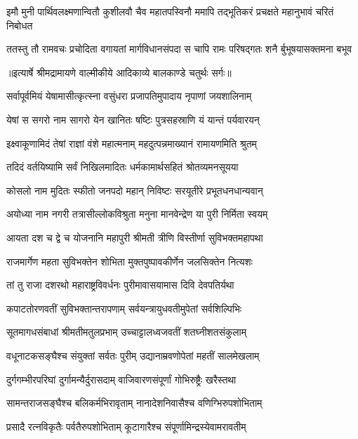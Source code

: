 \fourlineindentedshloka
{इमौ मुनी पार्थिवलक्ष्मणान्वितौ}
{ कुशीलवौ चैव महातपस्विनौ}
{ममापि तद्भूतिकरं प्रचक्षते}
{ महानुभावं चरितं निबोधत} %

\fourlineindentedshloka
{ततस्तु तौ रामवचः प्रचोदिता}
{वगायतां मार्गविधानसंपदा}
{स चापि रामः परिषद्गतः शनै}
{र्बुभूषयासक्तमना बभूव} %


{॥इत्यार्षे श्रीमद्रामायणे वाल्मीकीये आदिकाव्ये बालकाण्डे चतुर्थः सर्गः॥}


\twolineshloka
{सर्वापूर्वमियं येषामासीत्कृत्स्ना वसुंधरा}
{प्रजापतिमुपादाय नृपाणां जयशालिनाम्} %

\twolineshloka
{येषां स सगरो नाम सागरो येन खानितः}
{षष्टिः पुत्रसहस्राणि यं यान्तं पर्यवारयन्} %

\twolineshloka
{इक्ष्वाकूणामिदं तेषां राज्ञां वंशे महात्मनाम्}
{महदुत्पन्नमाख्यानं रामायणमिति श्रुतम्} %

\twolineshloka
{तदिदं वर्तयिष्यामि सर्वं निखिलमादितः}
{धर्मकामार्थसहितं श्रोतव्यमनसूयया} %

\twolineshloka
{कोसलो नाम मुदितः स्फीतो जनपदो महान्}
{निविष्टः सरयूतीरे प्रभूतधनधान्यवान्} %

\twolineshloka
{अयोध्या नाम नगरी तत्रासील्लोकविश्रुता}
{मनुना मानवेन्द्रेण या पुरी निर्मिता स्वयम्} %

\twolineshloka
{आयता दश च द्वे च योजनानि महापुरी}
{श्रीमती त्रीणि विस्तीर्णा सुविभक्तमहापथा} %

\twolineshloka
{राजमार्गेण महता सुविभक्तेन शोभिता}
{मुक्तपुष्पावकीर्णेन जलसिक्तेन नित्यशः} %

\twolineshloka
{तां तु राजा दशरथो महाराष्ट्रविवर्धनः}
{पुरीमावासयामास दिवि देवपतिर्यथा} %

\twolineshloka
{कपाटतोरणवतीं सुविभक्तान्तरापणाम्}
{सर्वयन्त्रायुधवतीमुपेतां सर्वशिल्पिभिः} %

\twolineshloka
{सूतमागधसंबाधां श्रीमतीमतुलप्रभाम्}
{उच्चाट्टालध्वजवतीं शतघ्नीशतसंकुलाम्} %

\twolineshloka
{वधूनाटकसङ्घैश्च संयुक्तां सर्वतः पुरीम्}
{उद्यानाम्रवणोपेतां महतीं सालमेखलाम्} %

\twolineshloka
{दुर्गगम्भीरपरिघां दुर्गामन्यैर्दुरासदाम्}
{वाजिवारणसंपूर्णां गोभिरुष्ट्रैः खरैस्तथा} %

\twolineshloka
{सामन्तराजसङ्घैश्च बलिकर्मभिरावृताम्}
{नानादेशनिवासैश्च वणिग्भिरुपशोभिताम्} %

\twolineshloka
{प्रसादै रत्नविकृतैः पर्वतैरुपशोभिताम्}
{कूटागारैश्च संपूर्णामिन्द्रस्येवामरावतीम्} %

